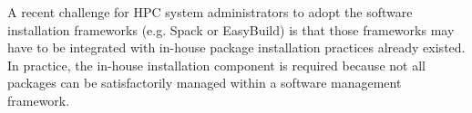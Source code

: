 \documentclass[conference]{IEEEtran}
\begin{document}


A recent challenge for HPC system administrators to adopt the software installation frameworks (e.g. Spack\cite{gamblin:15} or EasyBuild\cite{geimer:14}) is that those frameworks may have to be integrated with in-house package installation practices already existed. In practice, the in-house installation component is required because not all packages can be satisfactorily managed within a software management framework.
\end{document}

